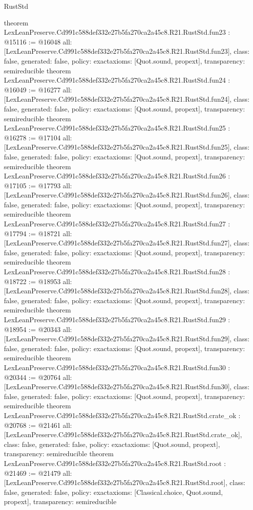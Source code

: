 \begin{lexlean}{RustStd}
\begin{coremodule}
{}
theorem LexLeanPreserve.Cd991c588def332e27b5fa270ca2a45c8.R21.RustStd.fun23 : @15116 := @16048 {
  all: [LexLeanPreserve.Cd991c588def332e27b5fa270ca2a45c8.R21.RustStd.fun23],
  class: false,
  generated: false,
  policy: exact{axioms: [Quot.sound, propext]},
  transparency: semireducible
}
theorem LexLeanPreserve.Cd991c588def332e27b5fa270ca2a45c8.R21.RustStd.fun24 : @16049 := @16277 {
  all: [LexLeanPreserve.Cd991c588def332e27b5fa270ca2a45c8.R21.RustStd.fun24],
  class: false,
  generated: false,
  policy: exact{axioms: [Quot.sound, propext]},
  transparency: semireducible
}
theorem LexLeanPreserve.Cd991c588def332e27b5fa270ca2a45c8.R21.RustStd.fun25 : @16278 := @17104 {
  all: [LexLeanPreserve.Cd991c588def332e27b5fa270ca2a45c8.R21.RustStd.fun25],
  class: false,
  generated: false,
  policy: exact{axioms: [Quot.sound, propext]},
  transparency: semireducible
}
theorem LexLeanPreserve.Cd991c588def332e27b5fa270ca2a45c8.R21.RustStd.fun26 : @17105 := @17793 {
  all: [LexLeanPreserve.Cd991c588def332e27b5fa270ca2a45c8.R21.RustStd.fun26],
  class: false,
  generated: false,
  policy: exact{axioms: [Quot.sound, propext]},
  transparency: semireducible
}
theorem LexLeanPreserve.Cd991c588def332e27b5fa270ca2a45c8.R21.RustStd.fun27 : @17794 := @18721 {
  all: [LexLeanPreserve.Cd991c588def332e27b5fa270ca2a45c8.R21.RustStd.fun27],
  class: false,
  generated: false,
  policy: exact{axioms: [Quot.sound, propext]},
  transparency: semireducible
}
theorem LexLeanPreserve.Cd991c588def332e27b5fa270ca2a45c8.R21.RustStd.fun28 : @18722 := @18953 {
  all: [LexLeanPreserve.Cd991c588def332e27b5fa270ca2a45c8.R21.RustStd.fun28],
  class: false,
  generated: false,
  policy: exact{axioms: [Quot.sound, propext]},
  transparency: semireducible
}
theorem LexLeanPreserve.Cd991c588def332e27b5fa270ca2a45c8.R21.RustStd.fun29 : @18954 := @20343 {
  all: [LexLeanPreserve.Cd991c588def332e27b5fa270ca2a45c8.R21.RustStd.fun29],
  class: false,
  generated: false,
  policy: exact{axioms: [Quot.sound, propext]},
  transparency: semireducible
}
theorem LexLeanPreserve.Cd991c588def332e27b5fa270ca2a45c8.R21.RustStd.fun30 : @20344 := @20764 {
  all: [LexLeanPreserve.Cd991c588def332e27b5fa270ca2a45c8.R21.RustStd.fun30],
  class: false,
  generated: false,
  policy: exact{axioms: [Quot.sound, propext]},
  transparency: semireducible
}
theorem LexLeanPreserve.Cd991c588def332e27b5fa270ca2a45c8.R21.RustStd.crate_ok : @20768 := @21461 {
  all: [LexLeanPreserve.Cd991c588def332e27b5fa270ca2a45c8.R21.RustStd.crate_ok],
  class: false,
  generated: false,
  policy: exact{axioms: [Quot.sound, propext]},
  transparency: semireducible
}
theorem LexLeanPreserve.Cd991c588def332e27b5fa270ca2a45c8.R21.RustStd.root : @21469 := @21479 {
  all: [LexLeanPreserve.Cd991c588def332e27b5fa270ca2a45c8.R21.RustStd.root],
  class: false,
  generated: false,
  policy: exact{axioms: [Classical.choice, Quot.sound, propext]},
  transparency: semireducible
}


\end{coremodule}
\end{lexlean}
